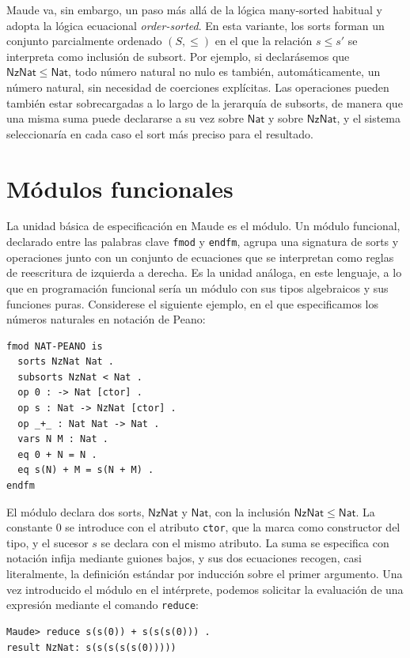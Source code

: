 Maude va, sin embargo, un paso m\'as all\'a de la l\'ogica many-sorted habitual y adopta la l\'ogica ecuacional \textit{order-sorted}. En esta variante, los sorts forman un conjunto parcialmente ordenado $(S, \leq)$ en el que la relaci\'on $s \leq s'$ se interpreta como inclusi\'on de subsort. Por ejemplo, si declarásemos que $\mathsf{NzNat} \leq \mathsf{Nat}$, todo número natural no nulo es también, automáticamente, un número natural, sin necesidad de coerciones explícitas. Las operaciones pueden también estar sobrecargadas a lo largo de la jerarquía de subsorts, de manera que una misma suma puede declararse a su vez sobre $\mathsf{Nat}$ y sobre $\mathsf{NzNat}$, y el sistema seleccionaría en cada caso el sort más preciso para el resultado.

\section{Módulos funcionales}
La unidad básica de especificación en Maude es el módulo. Un módulo funcional, declarado entre las palabras clave \texttt{fmod} y \texttt{endfm}, agrupa una signatura de sorts y operaciones junto con un conjunto de ecuaciones que se interpretan como reglas de reescritura de izquierda a derecha. Es la unidad análoga, en este lenguaje, a lo que en programación funcional sería un módulo con sus tipos algebraicos y sus funciones puras. Considerese el siguiente ejemplo, en el que especificamos los números naturales en notación de Peano:

\begin{lstlisting}
fmod NAT-PEANO is
  sorts NzNat Nat .
  subsorts NzNat < Nat .
  op 0 : -> Nat [ctor] .
  op s : Nat -> NzNat [ctor] .
  op _+_ : Nat Nat -> Nat .
  vars N M : Nat .
  eq 0 + N = N .
  eq s(N) + M = s(N + M) .
endfm
\end{lstlisting}

El módulo declara dos sorts, $\mathsf{NzNat}$ y $\mathsf{Nat}$, con la inclusión $\mathsf{NzNat} \leq \mathsf{Nat}$. La constante $0$ se introduce con el atributo \texttt{ctor}, que la marca como constructor del tipo, y el sucesor $s$ se declara con el mismo atributo. La suma se especifica con notación infija mediante guiones bajos, y sus dos ecuaciones recogen, casi literalmente, la definición estándar por inducción sobre el primer argumento. Una vez introducido el módulo en el intérprete, podemos solicitar la evaluación de una expresión mediante el comando \texttt{reduce}:

\begin{lstlisting}
Maude> reduce s(s(0)) + s(s(s(0))) .
result NzNat: s(s(s(s(s(0)))))
\end{lstlisting}

